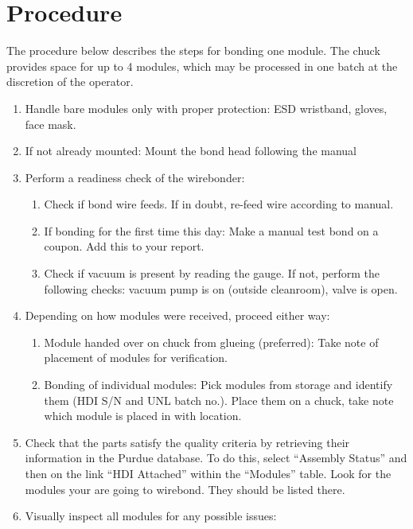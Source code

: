 \documentclass[12pt]{unlsilabsop}
\begin{document}
\section{Procedure}

The procedure below describes the steps for bonding one module. The chuck provides space for up to 4 modules, which may be processed in one batch at the discretion of the operator.
\begin{enumerate}
    \item Handle bare modules only with proper protection: ESD wristband, gloves, face mask.
    \item If not already mounted: Mount the bond head following the manual
    \item Perform a readiness check of the wirebonder:
    \begin{enumerate}
        \item Check if bond wire feeds. If in doubt, re-feed wire according to manual.
        \item If bonding for the first time this day: Make a manual test bond on a coupon. Add this to your report.
        \item Check if vacuum is present by reading the gauge. If not, perform the following checks: vacuum pump is on (outside cleanroom), valve is open.
    \end{enumerate}
    \item Depending on how modules were received, proceed either way:
    \begin{enumerate}
        \item Module handed over on chuck from glueing (preferred): Take note of placement of modules for verification.
        \item Bonding of individual modules: Pick modules from storage and identify them (HDI S/N and UNL batch no.). Place them on a chuck, take note which module is placed in with location.
    \end{enumerate}
    \item Check that the parts satisfy the quality criteria by retrieving their information in the Purdue database. To do this, select ``Assembly Status'' and then on the link ``HDI Attached'' within the ``Modules'' table. Look for the modules your are going to wirebond. They should be listed there.
    \item Visually inspect all modules for any possible issues:
    \begin{itemize}

\end{itemize}
\end{enumerate}
\end{document}
